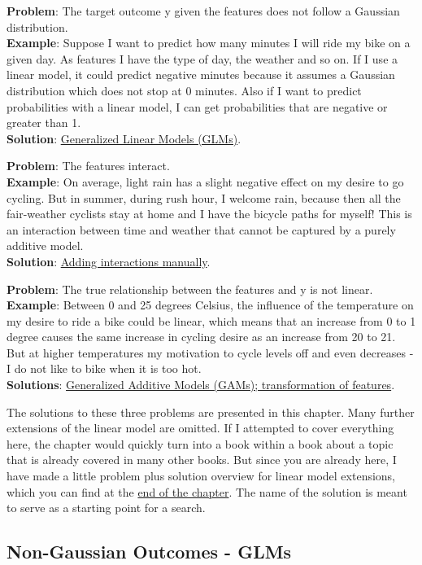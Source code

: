 \documentclass[
  11pt,
]{scrbook}
\begin{document}
\textbf{Problem}: The target outcome y given the features does not follow a Gaussian distribution.\\
\textbf{Example}: Suppose I want to predict how many minutes I will ride my bike on a given day.
As features I have the type of day, the weather and so on.
If I use a linear model, it could predict negative minutes because it assumes a Gaussian distribution which does not stop at 0 minutes.
Also if I want to predict probabilities with a linear model, I can get probabilities that are negative or greater than 1.\\
\textbf{Solution}: \protect\hyperlink{glm}{Generalized Linear Models (GLMs)}.

\textbf{Problem}: The features interact.\\
\textbf{Example}: On average, light rain has a slight negative effect on my desire to go cycling.
But in summer, during rush hour, I welcome rain, because then all the fair-weather cyclists stay at home and I have the bicycle paths for myself!
This is an interaction between time and weather that cannot be captured by a purely additive model.\\
\textbf{Solution}: \protect\hyperlink{lm-interact}{Adding interactions manually}.

\textbf{Problem}: The true relationship between the features and y is not linear.\\
\textbf{Example}: Between 0 and 25 degrees Celsius, the influence of the temperature on my desire to ride a bike could be linear, which means that an increase from 0 to 1 degree causes the same increase in cycling desire as an increase from 20 to 21.
But at higher temperatures my motivation to cycle levels off and even decreases - I do not like to bike when it is too hot.\\
\textbf{Solutions}: \protect\hyperlink{gam}{Generalized Additive Models (GAMs); transformation of features}.

The solutions to these three problems are presented in this chapter.
Many further extensions of the linear model are omitted.
If I attempted to cover everything here, the chapter would quickly turn into a book within a book about a topic that is already covered in many other books.
But since you are already here, I have made a little problem plus solution overview for linear model extensions, which you can find at the \protect\hyperlink{more-lm-extension}{end of the chapter}.
The name of the solution is meant to serve as a starting point for a search.

\hypertarget{glm}{%
\subsection{Non-Gaussian Outcomes - GLMs}\label{glm}}
\end{document}
